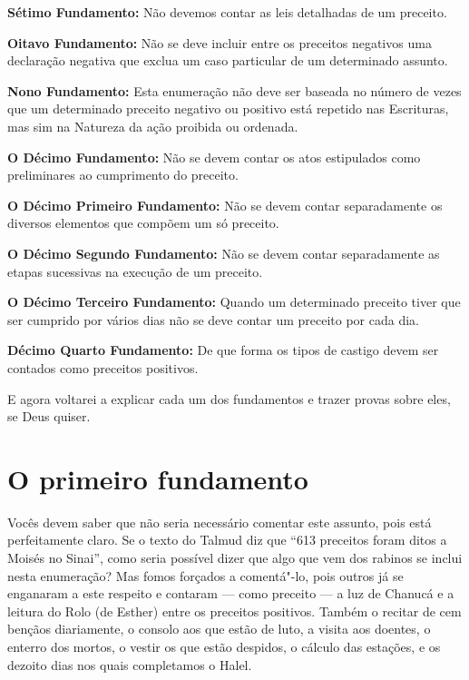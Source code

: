 \textbf{Sétimo Fundamento:} Não devemos contar as leis detalhadas de
um preceito.

\textbf{Oitavo Fundamento:} Não se deve incluir entre os preceitos
negativos uma declaração negativa que exclua um caso particular de um
determinado assunto.

\textbf{Nono Fundamento:} Esta enumeração não deve ser baseada no
número de vezes que um determinado preceito negativo ou positivo está
repetido nas Escrituras, mas sim na Natureza da ação proibida ou
ordenada.

\textbf{O Décimo Fundamento:} Não se devem contar os atos estipulados
como preliminares ao cumprimento do preceito.

\textbf{O Décimo Primeiro Fundamento:} Não se devem contar separadamente
os diversos elementos que compõem um só preceito.

\textbf{O Décimo Segundo Fundamento:} Não se devem contar separadamente
as etapas sucessivas na execução de um preceito.

\textbf{O Décimo Terceiro Fundamento:} Quando um determinado preceito
tiver que ser cumprido por vários dias não se deve contar um preceito
por cada dia.

\textbf{Décimo Quarto Fundamento:} De que forma os tipos de castigo
devem ser contados como preceitos positivos.

E agora voltarei a explicar cada um dos fundamentos e trazer provas
sobre eles, se Deus quiser.

\chapter*{O primeiro fundamento}

Vocês devem saber que não seria necessário comentar este
assunto, pois está perfeitamente claro. Se o texto do Talmud\starr{} diz que
``613 preceitos foram ditos a Moisés no Sinai'', como
seria possível dizer que algo que vem dos rabinos se inclui nesta
enumeração? Mas fomos forçados a comentá"-lo, pois outros já se enganaram
a este respeito e contaram --- como preceito --- a luz de Chanucá\starr{} e
a leitura do Rolo (de Esther) entre os preceitos positivos. Também o
recitar de cem bençãos diariamente, o consolo aos que estão de luto, a
visita aos doentes, o enterro dos mortos, o vestir os que estão
despidos, o cálculo das estações, e os dezoito dias nos quais
completamos o Halel\starr.

